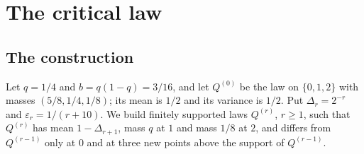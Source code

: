 \documentclass[11pt]{amsart}
\theoremstyle{definition}
\begin{document}
\section{The critical law}\label{sec:crit}

\subsection{The construction}

Let $q=1/4$ and $b=q(1-q)=3/16$, and let $Q^{(0)}$ be the law on $\{0,1,2\}$ with masses $(5/8,1/4,1/8)$; its mean is $1/2$ and its variance is $1/2$. Put $\Delta_r=2^{-r}$ and $\varepsilon_r=1/(r+10)$. We build finitely supported laws $Q^{(r)}$, $r\ge1$, such that $Q^{(r)}$ has mean $1-\Delta_{r+1}$, mass $q$ at $1$ and mass $1/8$ at $2$, and differs from $Q^{(r-1)}$ only at $0$ and at three new points above the support of $Q^{(r-1)}$.
\end{document}
